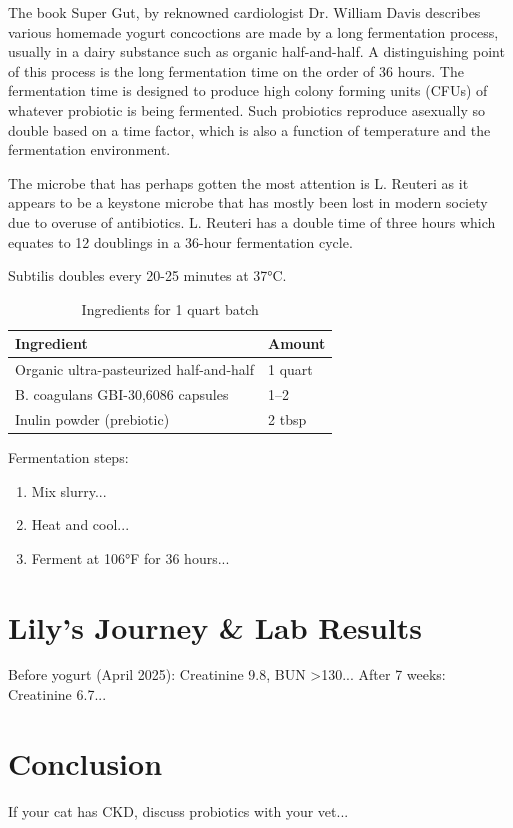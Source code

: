 \documentclass[twocolumn]{NobArticle}
\begin{document}
	The book Super Gut, by reknowned cardiologist Dr. William Davis describes various homemade yogurt concoctions are made by a long fermentation process, usually in a dairy substance such as organic half-and-half. A distinguishing point of this process is the long fermentation time on the order of 36 hours. The fermentation time is designed to produce high colony forming units (CFUs) of whatever probiotic is being fermented. Such probiotics reproduce asexually so double based on a time factor, which is also a function of temperature and the fermentation environment.
	
	The microbe that has perhaps gotten the most attention is L. Reuteri as it appears to be a keystone microbe that has mostly been lost in modern society due to overuse of antibiotics. L. Reuteri has a double time of three hours which equates to 12 doublings in a 36-hour fermentation cycle.
	 
	Subtilis doubles every 20-25 minutes at 37°C. 
	
	\begin{table}[ht]
		\centering
		\begin{tabular}{ll}
			\toprule
			\textbf{Ingredient} & \textbf{Amount} \\
			\midrule
			Organic ultra-pasteurized half-and-half & 1 quart \\
			B. coagulans GBI-30,6086 capsules & 1--2 \\
			Inulin powder (prebiotic) & 2 tbsp \\
			\bottomrule
		\end{tabular}
		\caption{Ingredients for 1 quart batch}
		\label{tab:recipe-ingredients}
	\end{table}
	
	Fermentation steps:
	\begin{enumerate}[leftmargin=*]
		\item Mix slurry...
		\item Heat and cool...
		\item Ferment at 106°F for 36 hours...
	\end{enumerate}
	
	\section{Lily's Journey \& Lab Results}
	Before yogurt (April 2025): Creatinine 9.8, BUN >130...  
	After 7 weeks: Creatinine 6.7...
	
	\section{Conclusion}
	If your cat has CKD, discuss probiotics with your vet...
	
	\printbibliography
	
\end{document}

